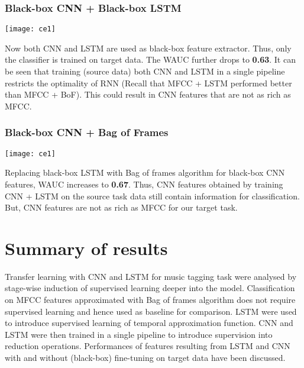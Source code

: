 \subsubsection{Black-box CNN + Black-box LSTM}
\begin{minipage}{0.15\textwidth}
\texttt{[image: ce1]}
\end{minipage}
\begin{minipage}{0.80\textwidth}
Now both CNN and LSTM are used as black-box feature extractor. Thus, only the classifier is trained on target data. The WAUC further drops to \textbf{0.63}. It can be seen that training (source data) both CNN and LSTM in a single pipeline restricts the optimality of RNN (Recall that MFCC + LSTM performed better than MFCC + BoF). This could result in CNN features that are not as rich as MFCC. 
\end{minipage}

\subsubsection{Black-box CNN + Bag of Frames}
\begin{minipage}{0.15\textwidth}
\texttt{[image: ce1]}
\end{minipage}
\begin{minipage}{0.80\textwidth}
Replacing black-box LSTM with Bag of frames algorithm for black-box CNN features, WAUC increases to \textbf{0.67}. Thus, CNN features obtained by training CNN + LSTM on the source task data still contain information for classification. But, CNN features are not as rich as MFCC for our target task.
\end{minipage}

\section{Summary of results}
\label{results}
Transfer learning with CNN and LSTM for music tagging task were analysed by stage-wise induction of supervised learning deeper into the model. Classification on MFCC features approximated with Bag of frames algorithm does not require supervised learning and hence used as baseline for comparison. LSTM were used to introduce supervised learning of temporal approximation function. CNN and LSTM were then trained in a single pipeline to introduce supervision into reduction operations. Performances of features resulting from LSTM and CNN with and without (black-box) fine-tuning on target data have been discussed. 

